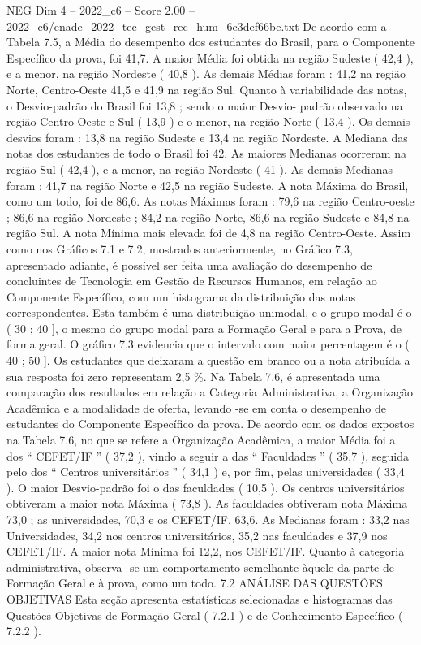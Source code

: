 \begin{textsample}{NEG Dim 4 – 2022\_c6 – Score 2.00 – 2022\_c6/enade\_2022\_tec\_gest\_rec\_hum\_6c3def66be.txt}
De acordo com a Tabela 7.5, a Média do desempenho dos estudantes do Brasil, para o Componente Específico da prova, foi 41,7.
A maior Média foi obtida na região Sudeste ( 42,4 ), e a menor, na região Nordeste ( 40,8 ).
As demais Médias foram : 41,2 na região Norte, Centro-Oeste 41,5 e 41,9 na região Sul.
Quanto à variabilidade das notas, o Desvio-padrão do Brasil foi 13,8 ; sendo o maior Desvio- padrão observado na região Centro-Oeste e Sul ( 13,9 ) e o menor, na região Norte ( 13,4 ).
Os demais desvios foram : 13,8 na região Sudeste e 13,4 na região Nordeste.
A Mediana das notas dos estudantes de todo o Brasil foi 42.
As maiores Medianas ocorreram na região Sul ( 42,4 ), e a menor, na região Nordeste ( 41 ).
As demais Medianas foram : 41,7 na região Norte e 42,5 na região Sudeste.
A nota Máxima do Brasil, como um todo, foi de 86,6.
As notas Máximas foram : 79,6 na região Centro-oeste ; 86,6 na região Nordeste ; 84,2 na região Norte, 86,6 na região Sudeste e 84,8 na região Sul.
A nota Mínima mais elevada foi de 4,8 na região Centro-Oeste.
Assim como nos Gráficos 7.1 e 7.2, mostrados anteriormente, no Gráfico 7.3, apresentado adiante, é possível ser feita uma avaliação do desempenho de concluintes de Tecnologia em Gestão de Recursos Humanos, em relação ao Componente Específico, com um histograma da distribuição das notas correspondentes.
Esta também é uma distribuição unimodal, e o grupo modal é o ( 30 ; 40 ], o mesmo do grupo modal para a Formação Geral e para a Prova, de forma geral.
O gráfico 7.3 evidencia que o intervalo com maior percentagem é o ( 40 ; 50 ].
Os estudantes que deixaram a questão em branco ou a nota atribuída a sua resposta foi zero representam 2,5 \%.
Na Tabela 7.6, é apresentada uma comparação dos resultados em relação a Categoria Administrativa, a Organização Acadêmica e a modalidade de oferta, levando -se em conta o desempenho de estudantes do Componente Específico da prova.
De acordo com os dados expostos na Tabela 7.6, no que se refere a Organização Acadêmica, a maior Média foi a dos “ CEFET/IF ” ( 37,2 ), vindo a seguir a das “ Faculdades ” ( 35,7 ), seguida pelo dos “ Centros universitários ” ( 34,1 ) e, por fim, pelas universidades ( 33,4 ).
O maior Desvio-padrão foi o das faculdades ( 10,5 ).
Os centros universitários obtiveram a maior nota Máxima ( 73,8 ).
As faculdades obtiveram nota Máxima 73,0 ; as universidades, 70,3 e os CEFET/IF, 63,6.
As Medianas foram : 33,2 nas Universidades, 34,2 nos centros universitários, 35,2 nas faculdades e 37,9 nos CEFET/IF.
A maior nota Mínima foi 12,2, nos CEFET/IF.
Quanto à categoria administrativa, observa -se um comportamento semelhante àquele da parte de Formação Geral e à prova, como um todo. 7.2 ANÁLISE DAS QUESTÕES OBJETIVAS Esta seção apresenta estatísticas selecionadas e histogramas das Questões Objetivas de Formação Geral ( 7.2.1 ) e de Conhecimento Específico ( 7.2.2 ).

\end{textsample}
